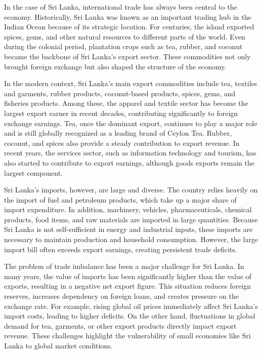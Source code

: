 \documentclass[12pt,a4paper]{report} %
\begin{document}
	In the case of Sri Lanka, international trade has always been central to the economy. Historically, Sri Lanka was known as an important trading hub in the Indian Ocean because of its strategic location. For centuries, the island exported spices, gems, and other natural resources to different parts of the world. Even during the colonial period, plantation crops such as tea, rubber, and coconut became the backbone of Sri Lanka’s export sector. These commodities not only brought foreign exchange but also shaped the structure of the economy.
	
	In the modern context, Sri Lanka’s main export commodities include tea, textiles and garments, rubber products, coconut-based products, spices, gems, and fisheries products. Among these, the apparel and textile sector has become the largest export earner in recent decades, contributing significantly to foreign exchange earnings. Tea, once the dominant export, continues to play a major role and is still globally recognized as a leading brand of Ceylon Tea. Rubber, coconut, and spices also provide a steady contribution to export revenue. In recent years, the services sector, such as information technology and tourism, has also started to contribute to export earnings, although goods exports remain the largest component.
	
	Sri Lanka’s imports, however, are large and diverse. The country relies heavily on the import of fuel and petroleum products, which take up a major share of import expenditure. In addition, machinery, vehicles, pharmaceuticals, chemical products, food items, and raw materials are imported in large quantities. Because Sri Lanka is not self-sufficient in energy and industrial inputs, these imports are necessary to maintain production and household consumption. However, the large import bill often exceeds export earnings, creating persistent trade deficits.
	
	The problem of trade imbalance has been a major challenge for Sri Lanka. In many years, the value of imports has been significantly higher than the value of exports, resulting in a negative net export figure. This situation reduces foreign reserves, increases dependency on foreign loans, and creates pressure on the exchange rate. For example, rising global oil prices immediately affect Sri Lanka’s import costs, leading to higher deficits. On the other hand, fluctuations in global demand for tea, garments, or other export products directly impact export revenue. These challenges highlight the vulnerability of small economies like Sri Lanka to global market conditions.
	
\end{document}
